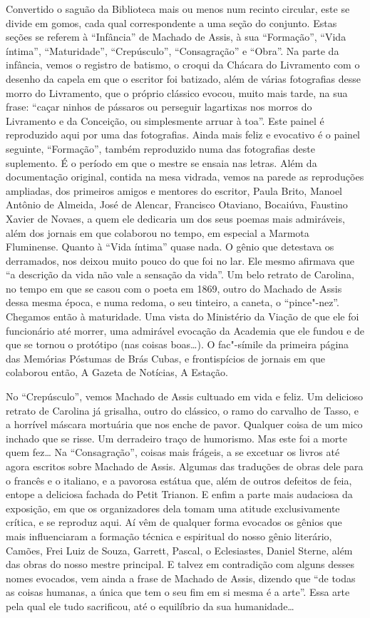 Convertido o saguão da Biblioteca mais ou menos num recinto circular,
este se divide em gomos, cada qual correspondente a uma seção do
conjunto. Estas seções se referem à ``Infância'' de Machado de Assis, à
sua ``Formação'', ``Vida íntima'', ``Maturidade'', ``Crepúsculo'',
``Consagração'' e ``Obra''. Na parte da infância, vemos o registro de
batismo, o croqui da Chácara do Livramento com o desenho da capela em
que o escritor foi batizado, além de várias fotografias desse morro do
Livramento, que o próprio clássico evocou, muito mais tarde, na sua
frase: ``caçar ninhos de pássaros ou perseguir lagartixas nos morros do
Livramento e da Conceição, ou simplesmente arruar à toa''. Este painel é
reproduzido aqui por uma das fotografias. Ainda mais feliz e evocativo é
o painel seguinte, ``Formação'', também reproduzido numa das fotografias
deste suplemento. É o período em que o mestre se ensaia nas letras. Além
da documentação original, contida na mesa vidrada, vemos na parede as
reproduções ampliadas, dos primeiros amigos e mentores do escritor,
Paula Brito, Manoel Antônio de Almeida, José de Alencar, Francisco
Otaviano, Bocaiúva, Faustino Xavier de Novaes, a quem ele dedicaria um
dos seus poemas mais admiráveis, além dos jornais em que colaborou no
tempo, em especial a Marmota Fluminense. Quanto à ``Vida íntima'' quase
nada. O gênio que detestava os derramados, nos deixou muito pouco do que
foi no lar. Ele mesmo afirmava que ``a descrição da vida não vale a
sensação da vida''. Um belo retrato de Carolina, no tempo em que se
casou com o poeta em 1869, outro do Machado de Assis dessa mesma época,
e numa redoma, o seu tinteiro, a caneta, o ``pince"-nez''. Chegamos então
à maturidade. Uma vista do Ministério da Viação de que ele foi
funcionário até morrer, uma admirável evocação da Academia que ele
fundou e de que se tornou o protótipo (nas coisas boas\ldots{}). O fac"-símile
da primeira página das Memórias Póstumas de Brás Cubas, e frontispícios
de jornais em que colaborou então, A Gazeta de Notícias, A Estação.

No ``Crepúsculo'', vemos Machado de Assis cultuado em vida e feliz. Um
delicioso retrato de Carolina já grisalha, outro do clássico, o ramo do
carvalho de Tasso, e a horrível máscara mortuária que nos enche de
pavor. Qualquer coisa de um mico inchado que se risse. Um derradeiro
traço de humorismo. Mas este foi a morte quem fez\ldots{} Na ``Consagração'',
coisas mais frágeis, a se excetuar os livros até agora escritos sobre
Machado de Assis. Algumas das traduções de obras dele para o francês e o
italiano, e a pavorosa estátua que, além de outros defeitos de feia,
entope a deliciosa fachada do Petit Trianon. E enfim a parte mais
audaciosa da exposição, em que os organizadores dela tomam uma atitude
exclusivamente crítica, e se reproduz aqui. Aí vêm de qualquer forma
evocados os gênios que mais influenciaram a formação técnica e
espiritual do nosso gênio literário, Camões, Frei Luiz de Souza,
Garrett, Pascal, o Eclesiastes, Daniel Sterne, além das obras do nosso
mestre principal. E talvez em contradição com alguns desses nomes
evocados, vem ainda a frase de Machado de Assis, dizendo que ``de todas
as coisas humanas, a única que tem o seu fim em si mesma é a arte''.
Essa arte pela qual ele tudo sacrificou, até o equilíbrio da sua
humanidade\ldots{}


